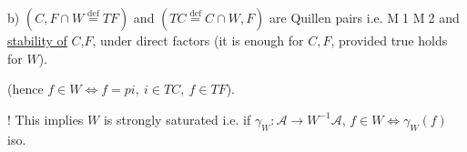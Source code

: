 
b) $(C,F\cap W\overset{\mathrm{def}}=TF)$ and $(TC\overset{\mathrm{def}}=C\cap W,F)$ are Quillen pairs i.e. \textcircled{M1} \textcircled{M2} and \uline{stability of} \textcircled{$C$},\textcircled{$F$},    under direct factors (it is enough for $C,F$, provided true holds for \textcircled{$W$}).


(hence  $f\in W\Longleftrightarrow f=pi,\ i\in TC,\ f\in TF$).

! This implies $W$ is strongly saturated i.e. if $\gamma_W:\mathscr A\to W^{-1}\mathscr A$, $f\in W\Longleftrightarrow \gamma_W(f)$ iso.

